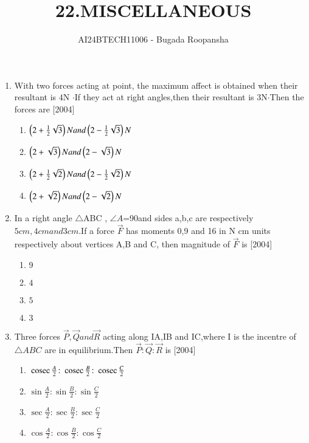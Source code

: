 \documentclass[journal,12pt,twocolumn]{IEEEtran}
\theoremstyle{remark}
\begin{document}

\vspace{3cm}

\title{22.MISCELLANEOUS}
\author{AI24BTECH11006 - Bugada Roopansha}
\begin{enumerate}[start=16]
\item With two forces acting at point, the maximum affect is obtained when their resultant is $4$N $\cdot$If they act at right angles,then their resultant is $3$N$\cdot$Then the forces are
\hfill{[2004]}
\begin{enumerate}
\item $\left(2+\frac{1}{2}\sqrt{3}\right)N and\left(2-\frac{1}{2}\sqrt{3}\right)N$
\item $\left(2+\sqrt{3}\right)N and \left(2-\sqrt{3}\right)N$
\item  $\left(2+\frac{1}{2}\sqrt{2}\right)N and\left(2-\frac{1}{2}\sqrt{2}\right)N$
\item $\left(2+\sqrt{2}\right)N and \left(2-\sqrt{2}\right)N$
\end{enumerate}
\item In a right angle $\triangle$ABC , $\angle A$=90\degree and sides a,b,c are respectively $5cm,4cm and 3cm .$If a force $ \vec{F}$ has moments 0,9 and 16 in N cm units respectively about vertices A,B and C, then magnitude of $\vec{F}$ is
\hfill{[2004]}
\begin{enumerate}
\item $9$
\item $4$
\item $5$
\item $3$
\end{enumerate}
\item Three forces $\vec{P},\vec{Q} and\vec{R}$ acting along IA,IB and IC,where I is the incentre of $\triangle{ABC}$ are in equilibrium.Then $\vec{P} \colon \vec{Q} \colon \vec{R}$ is
\hfill{[2004]}
\begin{enumerate}
\item $\,\text{cosec}\,{\frac{A}{2}}\colon\,\text{cosec}\,{\frac{B}{2}}\colon\,\text{cosec}\,{\frac{C}{2}}$
\item $\sin{\frac{A}{2}}\colon\sin{\frac{B}{2}}\colon\sin{\frac{C}{2}}$
\item $\sec{\frac{A}{2}}\colon\sec{\frac{B}{2}}\colon\sec{\frac{C}{2}}$
\item $\cos{\frac{A}{2}}\colon \cos{\frac{B}{2}}\colon \cos{\frac{C}{2}}$
\end{enumerate}

\end{enumerate}
\end{document}
